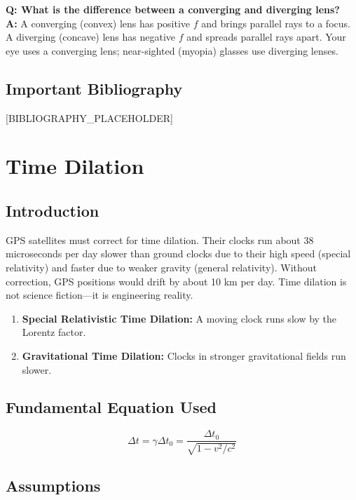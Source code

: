\documentclass[11pt,openright]{book}
\begin{document}
\textbf{Q: What is the difference between a converging and diverging lens?}\\
\textbf{A:} A converging (convex) lens has positive $f$ and brings parallel rays to a focus. A diverging (concave) lens has negative $f$ and spreads parallel rays apart. Your eye uses a converging lens; near-sighted (myopia) glasses use diverging lenses.
\section*{Important Bibliography}

[BIBLIOGRAPHY_PLACEHOLDER]


\chapter{Time Dilation}

\section*{Introduction}

GPS satellites must correct for time dilation. Their clocks run about 38 microseconds per day slower than ground clocks due to their high speed (special relativity) and faster due to weaker gravity (general relativity). Without correction, GPS positions would drift by about 10 km per day. Time dilation is not science fiction---it is engineering reality.

\begin{enumerate}
\item \textbf{Special Relativistic Time Dilation:} A moving clock runs slow by the Lorentz factor.

\item \textbf{Gravitational Time Dilation:} Clocks in stronger gravitational fields run slower.

\end{enumerate}
\section*{Fundamental Equation Used}

\[
\Delta t = \gamma \Delta t_0 = \frac{\Delta t_0}{\sqrt{1 - v^2/c^2}}
\]


\item
\section*{Assumptions}
\end{document}
